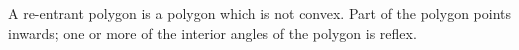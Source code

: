 A re-entrant polygon is a polygon which is not convex.
Part of the polygon points inwards; one or more of 
the interior angles of the polygon is reflex.